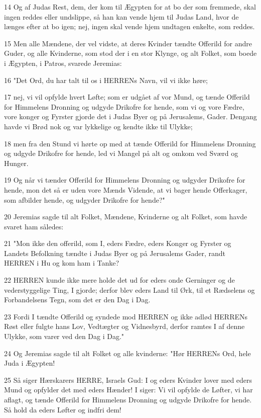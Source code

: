 \par 14 Og af Judas Rest, dem, der kom til Ægypten for at bo der som fremmede, skal ingen reddes eller undslippe, så han kan vende hjem til Judas Land, hvor de længes efter at bo igen; nej, ingen skal vende hjem undtagen enkelte, som reddes.
\par 15 Men alle Mændene, der vel vidste, at deres Kvinder tændte Offerild for andre Guder, og alle Kvinderne, som stod der i en stor Klynge, og alt Folket, som boede i Ægypten, i Patros, svarede Jeremias:
\par 16 "Det Ord, du har talt til os i HERRENs Navn, vil vi ikke høre;
\par 17 nej, vi vil opfylde hvert Løfte; som er udgået af vor Mund, og tænde Offerild for Himmelens Dronning og udgyde Drikofre for hende, som vi og vore Fædre, vore konger og Fyrster gjorde det i Judas Byer og på Jerusalems, Gader. Dengang havde vi Brød nok og var lykkelige og kendte ikke til Ulykke;
\par 18 men fra den Stund vi hørte op med at tænde Offerild for Himmelens Dronning og udgyde Drikofre for hende, led vi Mangel på alt og omkom ved Sværd og Hunger.
\par 19 Og når vi tænder Offerild for Himmelens Dronning og udgyder Drikofre for hende, mon det så er uden vore Mænds Vidende, at vi bager hende Offerkager, som afbilder hende, og udgyder Drikofre for hende?"
\par 20 Jeremias sagde til alt Folket, Mændene, Kvinderne og alt Folket, som havde svaret ham således:
\par 21 "Mon ikke den offerild, som I, eders Fædre, eders Konger og Fyrster og Landets Befolkning tændte i Judas Byer og på Jerusalems Gader, randt HERREN i Hu og kom ham i Tanke?
\par 22 HERREN kunde ikke mere holde det ud for eders onde Gerninger og de vederstyggelige Ting, I gjorde; derfor blev eders Land til Ørk, til et Rædselens og Forbandelsens Tegn, som det er den Dag i Dag.
\par 23 Fordi I tændte Offerild og syndede mod HERREN og ikke adlød HERRENs Røst eller fulgte hans Lov, Vedtægter og Vidnesbyrd, derfor ramtes I af denne Ulykke, som varer ved den Dag i Dag."
\par 24 Og Jeremias sagde til alt Folket og alle kvinderne: "Hør HERRENs Ord, hele Juda i Ægypten!
\par 25 Så siger Hærskarers HERRE, Israels Gud: I og eders Kvinder lover med eders Mund og opfylder det med eders Hænder! I siger: Vi vil opfylde de Løfter, vi har aflagt, og tænde Offerild for Himmelens Dronning og udgyde Drikofre for hende. Så hold da eders Løfter og indfri dem!
